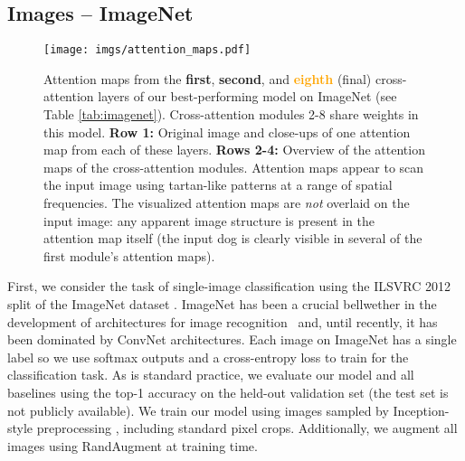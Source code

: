 \documentclass{article}
\begin{document}
\subsection{Images -- ImageNet}

\begin{figure*}
    \centering
    \texttt{[image: imgs/attention\_maps.pdf]}
    \vspace{-12pt}
    \caption{Attention maps from the \textbf{\textcolor{my_blue}{first}}, \textbf{\textcolor{my_green}{second}}, and \textbf{\textcolor{orange}{eighth}} (final) cross-attention layers of our best-performing model on ImageNet (see Table \ref{tab:imagenet}). Cross-attention modules 2-8 share weights in this model. \textbf{Row 1:} Original image and close-ups of one attention map from each of these layers. \textbf{Rows 2-4:} Overview of the attention maps of the cross-attention modules. Attention maps appear to scan the input image using tartan-like patterns at a range of spatial frequencies. The visualized attention maps are \textit{not} overlaid on the input image: any apparent image structure is present in the attention map itself (the input dog is clearly visible in several of the first module's attention maps).}
    \label{fig:attention_map}
    \vspace{-12pt}
\end{figure*}

First, we consider the task of single-image classification using the ILSVRC 2012 split of the ImageNet dataset \cite{deng2009imagenet}. ImageNet has been a crucial bellwether in the development of architectures for image recognition~\cite{krizhevsky2012imagenet,simonyan2014very,szegedy2015going,he2016deep} and, until recently, it has been dominated by ConvNet architectures. Each image on ImageNet has a single label so we use softmax outputs and a cross-entropy loss to train for the classification task. As is standard practice, we evaluate our model and all baselines using the top-1 accuracy on the held-out validation set (the test set is not publicly available). We train our model using images sampled by Inception-style preprocessing \cite{szegedy2015going}, including standard  pixel crops. Additionally, we augment all images using RandAugment \cite{cubuk2020randaugment} at training time.
\end{document}
